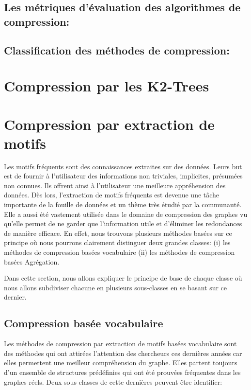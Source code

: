 \documentclass[a4paper,oneside,12pt]{report}
\theoremstyle{definition}
\begin{document}
	
			\subsection{Les métriques d'évaluation des algorithmes de compression:}
				
			
			\subsection{Classification des méthodes de compression:}
				
				
			\section{Compression par les K2-Trees}
				
				
			\section{Compression par extraction de motifs}
			 Les motifs fréquents sont des connaissances extraites sur des données. Leurs but est de fournir à l'utilisateur des informations non triviales, implicites, présumées non connues. Ils offrent ainsi à l'utilisateur une meilleure appréhension des données. Dès lors, l'extraction de motifs fréquents est  devenue une tâche importante de la fouille de données et un thème très étudié par la communauté. Elle a aussi été vastement%
			 utilisée dans le domaine de compression des graphes vu qu'elle permet de ne garder que l'information utile et d'éliminer les redondances de manière efficace. En effet, nous trouvons plusieurs méthodes basées sur ce principe où nous pourrons clairement distinguer deux grandes classes: 
			 (i) les méthodes  de compression basées vocabulaire
			 (ii) les méthodes  de compression basées Agrégation.
			 
				Dans cette section, nous allons expliquer le principe de base de chaque classe où nous allons subdiviser chacune  en plusieurs sous-classes en se basant sur ce dernier. 
			 
				\subsection{Compression basée vocabulaire}
				Les méthodes de compression par extraction de motifs basées vocabulaire sont des méthodes qui ont attirées l'attention des chercheurs ces dernières années car elles permettent une meilleur compréhension du graphe. Elles partent toujours d'un ensemble de structures prédéfinies qui ont été prouvées fréquentes dans les graphes réels. Deux sous classes de cette dernières peuvent être identifier:
				 
\end{document}
